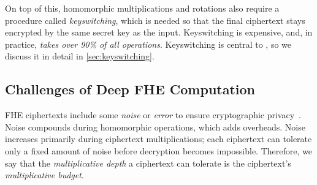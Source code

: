 On top of this, homomorphic multiplications and rotations also require a procedure called \emph{keyswitching},
which is needed so that the final ciphertext
stays encrypted by the same secret key as the input.
Keyswitching is expensive, and, in practice, \emph{takes over 90\% of all operations}.
Keyswitching is central to \name, so we discuss it in detail in \autoref{sec:keyswitching}.




\subsection{Challenges of Deep FHE Computation}\label{sec:deepChallenges}


FHE ciphertexts include some \emph{noise} or \emph{error} %
to ensure cryptographic privacy~\cite{lyubashevsky:tact10:ideal}.
Noise compounds during homomorphic operations, which adds overheads.
Noise increases primarily during ciphertext multiplications;
each ciphertext can tolerate
only a fixed amount of noise before decryption becomes impossible.
Therefore, we say that the \emph{multiplicative depth} a ciphertext can tolerate
is the ciphertext's \emph{multiplicative budget}.

